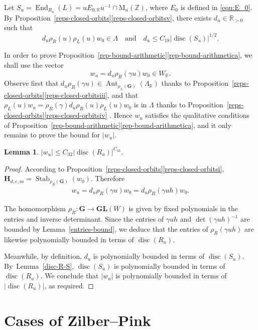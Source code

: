 \documentclass[JEP,XML,SOM,Unicode,NoFloatCountersInSection]{cedram}
\newcommand{\bR}{\mathbb{R}}
\newcommand{\bZ}{\mathbb{Z}}
\newcommand{\gG}{\mathbf{G}}
\newcommand{\gGL}{\mathbf{GL}}
\newcommand{\gH}{\mathbf{H}}
\newcommand{\rM}{\mathrm{M}}
\DeclareMathOperator{\Aut}{Aut}
\DeclareMathOperator{\disc}{disc}
\DeclareMathOperator{\End}{End}
\DeclareMathOperator{\Stab}{Stab}
\newcommand{\abs}[1]{\lvert #1 \rvert}
\newtheorem{lemma}{Lemma}[section]
\begin{document}
Let $S_u = \End_{R_u}(L) = uE_{0,\bR}u^{-1} \cap \rM_n(\bZ)$, where $E_0$ is defined in \eqref{eqn:E_0}.
By Proposition~\ref{reps-closed-orbits}\eqref{reps-closed-orbitsv}, there exists $d_u \in \bR_{>0}$ such that
\[
d_u \rho_R(u) \rho_L(u) w_0 \in \Lambda \quad \text{and} \quad d_u \leq C_{18} \abs{\disc(S_u)}^{1/2}.
\]

In order to prove Proposition~\ref{rep-bound-arithmetic}\eqref{rep-bound-arithmetica}, we shall use the vector
\[
w_u = d_u\rho_R(\gamma u)w_0 \in W_\bR.
\]
Observe first that $d_u\rho_R(\gamma u) \in \Aut_{\rho_L(\gG)}(\Lambda_\bR)$ thanks to Proposition~\ref{reps-closed-orbits}\eqref{reps-closed-orbitsiii}, and that $\rho_L(u)w_u = \rho_R(\gamma) d_u \rho_R(u) \rho_L(u) w_0$ is in $\Lambda$ thanks to Proposition~\ref{reps-closed-orbits}\eqref{reps-closed-orbitsiv} .
Hence $w_u$ satisfies the qualitative conditions of Proposition~\ref{rep-bound-arithmetic}\eqref{rep-bound-arithmetica}, and it only remains to prove the bound for $\abs{w_u}$.

\begin{lemma} \label{length-wu}
$\abs{w_u} \leq C_{32} \abs{\disc(R_u)}^{C_{33}}$.
\end{lemma}

\begin{proof}
According to Proposition~\ref{reps-closed-orbits}\eqref{reps-closed-orbitsi}, $\gH_{d,e,m} = \Stab_{\rho_R(\gG)}(w_0)$.
Therefore
\begin{align*}
w_u = d_u\rho_R(\gamma u)w_0 = d_u\rho_R(\gamma uh)w_0.
\end{align*}

The homomorphism $\rho_R \colon \gG \to \gGL(W)$ is given by fixed polynomials in the entries and inverse determinant.
Since the entries of $\gamma uh$ and $\det(\gamma uh)^{-1}$ are bounded by Lemma~\ref{entries-bound}, we deduce that the entries of $\rho_R(\gamma uh)$ are likewise polynomially bounded in terms of $\disc(R_u)$.

Meanwhile, by definition, $d_u$ is polynomially bounded in terms of $\disc(S_u)$.
By~Lem\-ma~\ref{disc-R-S}, $\disc(S_u)$ is polynomially bounded in terms of $\disc(R_u)$.
We conclude that $\abs{w_u}$ is polynomially bounded in terms of $\abs{\disc(R_u)}$, as required.
\end{proof}

\section{Cases of Zilber--Pink}\label{cases-of-ZP}
\end{document}
